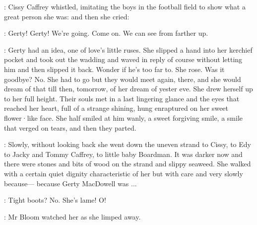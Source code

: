 :
Cissy Caffrey whistled,
imitating the boys in the football field to show
what a great person she was:
and then she cried:

\cissy:
Gerty!
Gerty!
We're going.
Come on.
We can see from farther up.

:
Gerty had an idea,
one of love's little ruses.
She slipped a hand into
her kerchief pocket and took out the wadding and waved in reply of course
without letting him and then slipped it back.
Wonder if he's too far to.
She rose.
Was it goodbye?
No.
She had to go but they would meet again,
there,
and she would dream of that till then,
tomorrow,
of her dream of
yester eve.
She drew herself up to her full height.
Their souls met in a
last lingering glance and the eyes that reached her heart,
full of a
strange shining,
hung enraptured on her sweet flower·like face.
She half
smiled at him wanly,
a sweet forgiving smile,
a smile that verged on
tears,
and then they parted.

:
Slowly,
without looking back she went down the uneven strand to
Cissy,
to Edy to Jacky and Tommy Caffrey,
to little baby Boardman.
It was
darker now and there were stones and bits of wood on the strand and slippy
seaweed.
She walked with a certain quiet dignity characteristic of her but
with care
and very slowly because—%
because Gerty MacDowell was ...

\Bloom:
Tight boots?
No.
She's lame!
O!

:
Mr Bloom watched her as she limped away.

